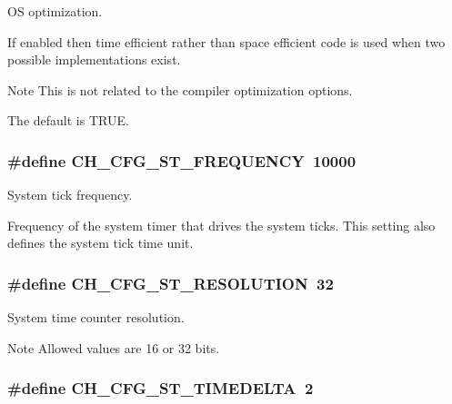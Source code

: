 O\+S optimization. 

If enabled then time efficient rather than space efficient code is used when two possible implementations exist.

\begin{DoxyNote}{Note}
This is not related to the compiler optimization options. 

The default is {\ttfamily T\+R\+U\+E}. 
\end{DoxyNote}
\hypertarget{group__config_ga174ac107e620ac81bb1487c1ad7ad839}{
\subsubsection[{C\+H\+\_\+\+C\+F\+G\+\_\+\+S\+T\+\_\+\+F\+R\+E\+Q\+U\+E\+N\+C\+Y}]{\setlength{\rightskip}{0pt plus 5cm}\#define C\+H\+\_\+\+C\+F\+G\+\_\+\+S\+T\+\_\+\+F\+R\+E\+Q\+U\+E\+N\+C\+Y~10000}}\label{group__config_ga174ac107e620ac81bb1487c1ad7ad839}


System tick frequency. 

Frequency of the system timer that drives the system ticks. This setting also defines the system tick time unit. \hypertarget{group__config_ga2af9a4c66ec41bad799a27c94728c1ae}{
\subsubsection[{C\+H\+\_\+\+C\+F\+G\+\_\+\+S\+T\+\_\+\+R\+E\+S\+O\+L\+U\+T\+I\+O\+N}]{\setlength{\rightskip}{0pt plus 5cm}\#define C\+H\+\_\+\+C\+F\+G\+\_\+\+S\+T\+\_\+\+R\+E\+S\+O\+L\+U\+T\+I\+O\+N~32}}\label{group__config_ga2af9a4c66ec41bad799a27c94728c1ae}


System time counter resolution. 

\begin{DoxyNote}{Note}
Allowed values are 16 or 32 bits. 
\end{DoxyNote}
\hypertarget{group__config_ga11ec0b9fb6a84d32dbc8567cc4af4d17}{
\subsubsection[{C\+H\+\_\+\+C\+F\+G\+\_\+\+S\+T\+\_\+\+T\+I\+M\+E\+D\+E\+L\+T\+A}]{\setlength{\rightskip}{0pt plus 5cm}\#define C\+H\+\_\+\+C\+F\+G\+\_\+\+S\+T\+\_\+\+T\+I\+M\+E\+D\+E\+L\+T\+A~2}}\label{group__config_ga11ec0b9fb6a84d32dbc8567cc4af4d17}


